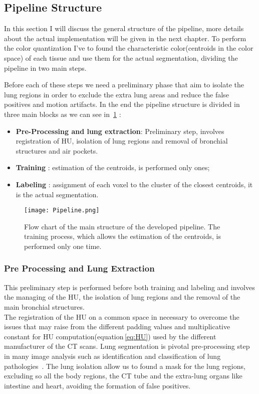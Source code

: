 \documentclass{standalone}
\begin{document}
	\subsection{Pipeline Structure}
	
	In this section I will discuss the general structure of the pipeline, more details about the actual implementation will be given in the next chapter.
	To perform the color quantization I've to found the characteristic color(centroids in the color space) of each tissue and use them for the actual segmentation, dividing the pipeline in two main steps.
	
	 Before each of these steps we need a preliminary phase that aim to isolate the lung regions in order to exclude the extra lung areas and reduce the false positives and motion artifacts.
	In the end the pipeline structure is divided in three main blocks as we can see in \figurename\,\ref{fig:Pipeline} : 
	\begin{itemize}
		\item \textbf{Pre-Processing and lung extraction}: Preliminary step, involves registration of HU, isolation of lung regions and removal of bronchial structures and air pockets.
		
		\item \textbf{Training} : estimation of the centroids, is performed only ones; 
		
		\item \textbf{Labeling} :  assignment of each voxel to the cluster of the closest centroids, it is the actual segmentation.
	\end{itemize}
	
		
	\begin{figure}[h!]
		\centering 
			\texttt{[image: Pipeline.png]}
		\caption{Flow chart of the main structure of the developed pipeline. The training process, which allows the estimation of the centroids, is performed only one time.}\label{fig:Pipeline}
	\end{figure} 
	
	\subsubsection*{Pre Processing and Lung Extraction}
	
	This preliminary step is performed before both training and labeling and involves the managing of the HU, the isolation of lung regions and the removal of the main bronchial structures.\\
	The registration of the HU on a common space in necessary to overcome the issues that may raise from the different padding values and multiplicative constant for HU computation(equation\,\ref{eq:HU}) used by the different manufacturer of the CT scans.
	Lung segmentation is pivotal pre-processing step in many image analysis such as identification and classification of lung pathologies~\cite{ART:Johannes}. The lung isolation allow us to found a mask for the lung regions, excluding so all the body regions, the CT tube and the extra-lung organs like intestine and heart, avoiding the formation of false positives.
	
\end{document}
